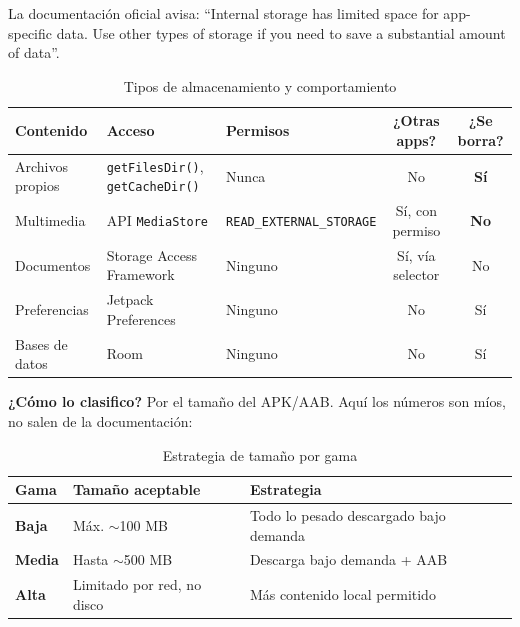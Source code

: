 \documentclass[11pt,a4paper]{article}
\newcommand{\code}[1]{\texttt{\color{ink}#1}}
\newcommand{\campo}[1]{\textbf{\color{ink}#1}}
\begin{document}
	La documentación oficial avisa: \enquote{Internal storage has limited space for app-specific data. Use other types of storage if you need to save a substantial amount of data}.
	
	\begin{table}[htbp]
		\centering
		\footnotesize
		\begin{tabularx}{\textwidth}{@{}>{\RaggedRight\arraybackslash}p{2.8cm} >{\RaggedRight\arraybackslash}p{3cm} >{\RaggedRight\arraybackslash}p{3cm} c c@{}}
			\toprule
			\rowcolor{primary}
			\textcolor{paper}{\sffamily\bfseries Contenido} & \textcolor{paper}{\sffamily\bfseries Acceso} & \textcolor{paper}{\sffamily\bfseries Permisos} & \textcolor{paper}{\sffamily\bfseries ¿Otras apps?} & \textcolor{paper}{\sffamily\bfseries ¿Se borra?} \\
			\midrule
			Archivos propios & \code{getFilesDir()}, \code{getCacheDir()} & Nunca & No & \textbf{Sí} \\
			\rowcolor{soft}
			Multimedia & API \code{MediaStore} & \code{READ\_EXTERNAL\_STORAGE} & Sí, con permiso & \textbf{No} \\
			Documentos & Storage Access Framework & Ninguno & Sí, vía selector & No \\
			\rowcolor{soft}
			Preferencias & Jetpack Preferences & Ninguno & No & Sí \\
			Bases de datos & Room & Ninguno & No & Sí \\
			\bottomrule
		\end{tabularx}
		\caption{Tipos de almacenamiento y comportamiento}
	\end{table}
	
	\campo{¿Cómo lo clasifico?} Por el tamaño del APK/AAB. Aquí los números son míos, no salen de la documentación:
	
	\begin{table}[htbp]
		\centering
		\small
		\begin{tabularx}{\textwidth}{@{}l l >{\RaggedRight\arraybackslash}X@{}}
			\toprule
			\rowcolor{primary}
			\textcolor{paper}{\sffamily\bfseries Gama} & \textcolor{paper}{\sffamily\bfseries Tamaño aceptable} & \textcolor{paper}{\sffamily\bfseries Estrategia} \\
			\midrule
			\textbf{Baja} & Máx. $\sim$100 MB & Todo lo pesado descargado bajo demanda \\
			\rowcolor{soft}
			\textbf{Media} & Hasta $\sim$500 MB & Descarga bajo demanda + AAB \\
			\textbf{Alta} & Limitado por red, no disco & Más contenido local permitido \\
			\bottomrule
		\end{tabularx}
		\caption{Estrategia de tamaño por gama}
	\end{table}
	
\end{document}
